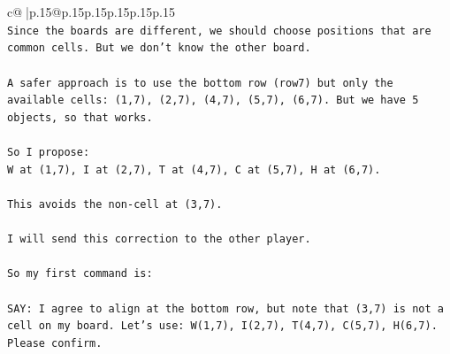 \documentclass{article}
\begin{document}
{\begin{supertabular}{c@{$\;$}|p{.15\linewidth}@{}p{.15\linewidth}p{.15\linewidth}p{.15\linewidth}p{.15\linewidth}p{.15\linewidth}}
{{{\\ 
\texttt{Since the boards are different, we should choose positions that are common cells. But we don't know the other board.} \\
\\ 
\texttt{A safer approach is to use the bottom row (row7) but only the available cells: (1,7), (2,7), (4,7), (5,7), (6,7). But we have 5 objects, so that works.} \\
\\ 
\texttt{So I propose: } \\
\texttt{W at (1,7), I at (2,7), T at (4,7), C at (5,7), H at (6,7).} \\
\\ 
\texttt{This avoids the non{-}cell at (3,7).} \\
\\ 
\texttt{I will send this correction to the other player.} \\
\\ 
\texttt{So my first command is:} \\
\\ 
\texttt{SAY: I agree to align at the bottom row, but note that (3,7) is not a cell on my board. Let's use: W(1,7), I(2,7), T(4,7), C(5,7), H(6,7). Please confirm.} \\
            }
        }
    }
     \\ \\


\end{supertabular}}
\end{document}
